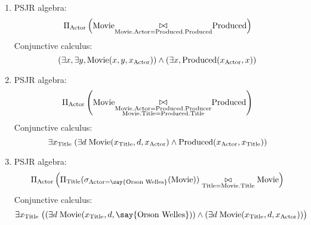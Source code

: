 \documentclass{../../cs-classes/cs-classes}
\newcommand*{\titl}{\textnormal{Title}}
\newcommand*{\movie}{\textnormal{Movie}}
\newcommand*{\actor}{\textnormal{Actor}}
\newcommand*{\produced}{\textnormal{Produced}}
\newcommand*{\producer}{\textnormal{Producer}}
\newcommand{\constant}[1]{\textnormal{\say{#1}}}
\begin{document}
\begin{exercise}
\begin{enumerate}
        \item PSJR algebra:
        \begin{equation*}
            \Pi_{\actor}\left(\movie\underset{\movie.\actor=\produced.\produced}{\mathlarger\bowtie}\produced\right)
        \end{equation*}
        Conjunctive calculus:
        \begin{equation*}
            (\exists x, \exists y, \movie(x, y, x_{\actor})) \land (\exists x, \produced(x_{\actor}, x))
        \end{equation*}

        \item PSJR algebra:
        \begin{equation*}
            \Pi_{\actor}\left(\movie\underset{\substack{\movie.\actor=\produced.\producer\\\movie.\titl=\produced.\titl}}{\mathlarger\bowtie}\produced\right)
        \end{equation*}
        Conjunctive calculus:
        \begin{equation*}
            \exists x_{\titl} \; (\exists d \; \movie(x_{\titl}, d, x_{\actor}) \land \produced(x_{\actor}, x_{\titl}))
        \end{equation*}

        \item PSJR algebra:
        \begin{equation*}
           \Pi_{\actor}\left(\Pi_{\titl}(\sigma_{\actor=\constant{Orson Welles}}(\movie))\underset{\titl=\movie.\titl}{\bowtie}\movie\right)
        \end{equation*}
        Conjunctive calculus:
        \begin{equation*}
            \exists x_{\titl}\; \big((\exists d \; \movie(x_{\titl}, d, \constant{Orson Welles})) \land (\exists d \; \movie(x_{\titl}, d, x_{\actor}))\big)
        \end{equation*}


\end{enumerate}
\end{exercise}
\end{document}
